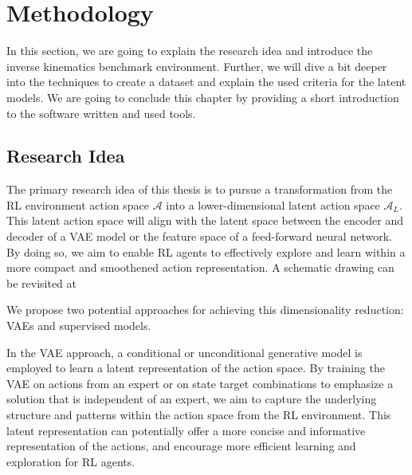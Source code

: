 \chapter{Methodology}\label{chap:Methodology}

In this section, we are going to explain the research idea and introduce the inverse kinematics benchmark environment. Further, we will dive a bit deeper into the techniques to create a dataset and explain the used criteria for the latent models. We are going to conclude this chapter by providing a short introduction to the software written and used tools.

\section{Research Idea}

The primary research idea of this thesis is to pursue a transformation from the RL environment action space $\mathcal{A}$ into a lower-dimensional latent action space $\mathcal{A}_L$. This latent action space will align with the latent space between the encoder and decoder of a VAE model or the feature space of a feed-forward neural network. By doing so, we aim to enable RL agents to effectively explore and learn within a more compact and smoothened action representation. A schematic drawing can be revisited at 

We propose two potential approaches for achieving this dimensionality reduction: VAEs and supervised models.

In the VAE approach, a conditional or unconditional generative model is employed to learn a latent representation of the action space. By training the VAE on actions from an expert or on state target combinations to emphasize a solution that is independent of an expert, we aim to capture the underlying structure and patterns within the action space from the RL environment. This latent representation can potentially offer a more concise and informative representation of the actions, and encourage more efficient learning and exploration for RL agents.

